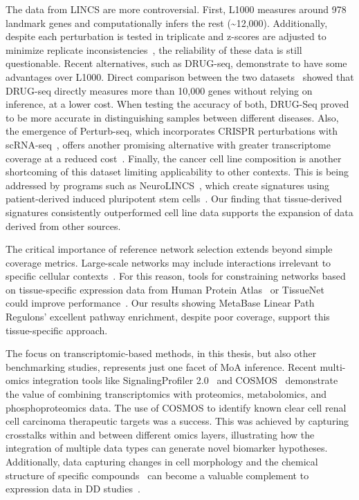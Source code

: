 The data from \gls{LINCS} are more controversial. 
First, L1000 measures around 978 landmark genes and computationally infers the rest (\textasciitilde12,000). 
Additionally, despite each perturbation is tested in triplicate and z-scores are adjusted to minimize replicate inconsistencies~\cite{RN30}, the reliability of these data is still questionable. 
Recent alternatives, such as DRUG-seq, demonstrate to have some advantages over L1000. 
Direct comparison between the two datasets~\cite{RN130, RN105} showed that DRUG-seq directly measures more than 10,000 genes without relying on inference, at a lower cost. 
When testing the accuracy of both, DRUG-Seq proved to be more accurate in distinguishing samples between different diseases. 
Also, the emergence of Perturb-seq, which incorporates \gls{CRISPR} perturbations with \gls{scRNA-seq}~\cite{RN89}, offers another promising alternative with greater transcriptome coverage at a reduced cost~\cite{RN165}. 
Finally, the cancer cell line composition is another shortcoming of this dataset limiting applicability to other contexts. 
This is being addressed by programs such as Neuro\gls{LINCS}~\cite{RN164}, which create signatures using patient-derived induced pluripotent stem cells~\cite{RN165}. 
Our finding that tissue-derived signatures consistently outperformed cell line data supports the expansion of data derived from other sources.

The critical importance of reference network selection extends beyond simple coverage metrics. 
Large-scale networks may include interactions irrelevant to specific cellular contexts~\cite{RN38}. 
For this reason, tools for constraining networks based on tissue-specific expression data from Human Protein Atlas~\cite{RN166} or TissueNet~\cite{RN137} could improve performance~\cite{RN38}. 
Our results showing MetaBase Linear Path Regulons' excellent pathway enrichment, despite poor coverage, support this tissue-specific approach.

The focus on transcriptomic-based methods, in this thesis, but also other benchmarking studies, represents just one facet of \gls{MoA} inference.
Recent multi-omics integration tools like SignalingProfiler 2.0~\cite{RN100} and COSMOS~\cite{RN99} demonstrate the value of combining transcriptomics with proteomics, metabolomics, and phosphoproteomics data. 
The use of COSMOS to identify known clear cell renal cell carcinoma therapeutic targets was a success.
This was achieved by capturing crosstalks within and between different omics layers, illustrating how the integration of multiple data types can generate novel biomarker hypotheses. 
Additionally, data capturing changes in cell morphology and the chemical structure of specific compounds~\cite{RN167} can become a valuable complement to expression data in \gls{DD} studies~\cite{RN38}. 

